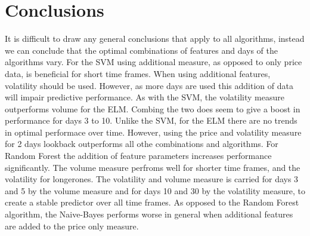 \documentclass{article}
\begin{document}
\section{Conclusions}
It is difficult to draw any general conclusions that apply to all algorithms, instead we can conclude that the optimal combinations of features and days of the algorithms vary. For the SVM using additional measure, as opposed to only price data, is beneficial for short time frames. When using additional features, volatility should be used. However, as more days are used this addition of data will impair predictive performance. As with the SVM, the volatility measure outperforms volume for the ELM. Combing the two does seem to give a boost in performance for days 3 to 10. Unlike the SVM, for the ELM there are no trends in optimal performace over time. However, using the price and volatility measure for 2 days lookback outperforms all othe combinations and algorithms. For Random Forest the addition of feature parameters increases performance significantly. The volume measure perfroms well for shorter time frames, and the volatility for longerones. The volatility and volume measure is carried for days 3 and 5 by the volume measure and for days 10 and 30 by the volatility measure, to create a stable predictor over all time frames. As opposed to the Random Forest algorithm, the Naive-Bayes performs worse in general when additional features are added to the price only measure. 


\newpage
\end{document}

